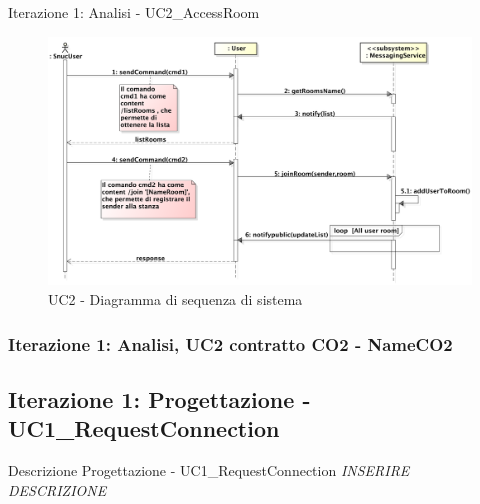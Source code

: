 \documentclass[t]{beamer} %
\begin{document}
\begin{frame} {Iterazione 1: Analisi - UC2\_AccessRoom}
   \begin{figure}
     \includegraphics[scale=0.25]{image_astah/Iteration_1_DomainModel/UC2_AccessRoom_SSD.png}{\centering}
     \caption{UC2 - Diagramma di sequenza di sistema}
     \label{fig_UC2_AR_SSD} 
   \end{figure}
\end{frame}

\begin{frame}
 \frametitle{Iterazione 1: Analisi, UC2 contratto CO2 - NameCO2}
  \begin{table}[!htbp]
   \caption {UC2 Contratto CO2 - NameCO2}
    \label{table:1}
   \end{table}
\end{frame}

\subsection{Iterazione 1: Progettazione - UC1\_RequestConnection}
\begin{frame} {Descrizione Progettazione - UC1\_RequestConnection }
 \emph{INSERIRE DESCRIZIONE}
\end{frame}
\end{document}

